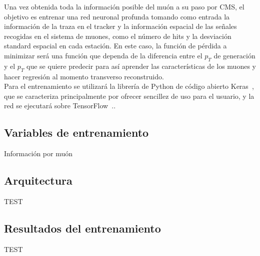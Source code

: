 
Una vez obtenida toda la informaci\'on posible del mu\'on a su paso por CMS, el objetivo es entrenar una red neuronal profunda tomando como entrada la informaci\'on de la traza en el tracker y la informaci\'on espacial de las señales recogidas en el sistema de muones, como el n\'umero de hits y la desviaci\'on standard espacial en cada estaci\'on. En este caso, la funci\'on de p\'erdida a minimizar ser\'a  una funci\'on que dependa de la diferencia entre el $p_{T}$ de generaci\'on y el $p_{T}$ que se quiere predecir para as\'i aprender las caracter\'isticas de los muones y hacer regresi\'on al momento transverso reconstruido. \\

Para el entrenamiento se utilizar\'a la librer\'ia de Python de c\'odigo abierto Keras~\cite{chollet2015keras}, que se caracteriza principalmente por ofrecer sencillez de uso para el usuario, y la red se ejecutar\'a sobre TensorFlow~\cite{tensorflow2015-whitepaper}.. 



\subsection{Variables de entrenamiento}\label{sec:variables}

Informaci\'on por mu\'on


\subsection{Arquitectura}\label{sec:arch}

TEST

\subsection{Resultados del entrenamiento}\label{sec:trainresults}

TEST
